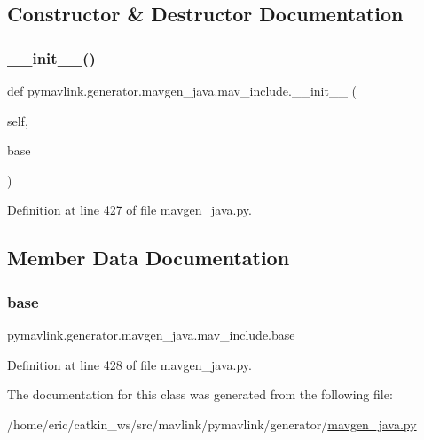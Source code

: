 \subsection{Constructor \& Destructor Documentation}
\mbox{\label{classpymavlink_1_1generator_1_1mavgen__java_1_1mav__include_a1bc1ed7cfef7a94f8ab9f9f8f5d7afad}} 
\subsubsection{\texorpdfstring{\_\_init\_\_()}{\_\_init\_\_()}}
{\footnotesize\ttfamily def pymavlink.\+generator.\+mavgen\+\_\+java.\+mav\+\_\+include.\+\_\+\+\_\+init\+\_\+\+\_\+ (\begin{DoxyParamCaption}\item[{}]{self,  }\item[{}]{base }\end{DoxyParamCaption})}



Definition at line 427 of file mavgen\+\_\+java.\+py.



\subsection{Member Data Documentation}
\mbox{\label{classpymavlink_1_1generator_1_1mavgen__java_1_1mav__include_a47b56477ee0fc60313b62235eabdd5e5}} 
\subsubsection{\texorpdfstring{base}{base}}
{\footnotesize\ttfamily pymavlink.\+generator.\+mavgen\+\_\+java.\+mav\+\_\+include.\+base}



Definition at line 428 of file mavgen\+\_\+java.\+py.



The documentation for this class was generated from the following file\+:\begin{DoxyCompactItemize}
\item 
/home/eric/catkin\+\_\+ws/src/mavlink/pymavlink/generator/\mbox{\hyperlink{mavgen__java_8py}{mavgen\+\_\+java.\+py}}\end{DoxyCompactItemize}

